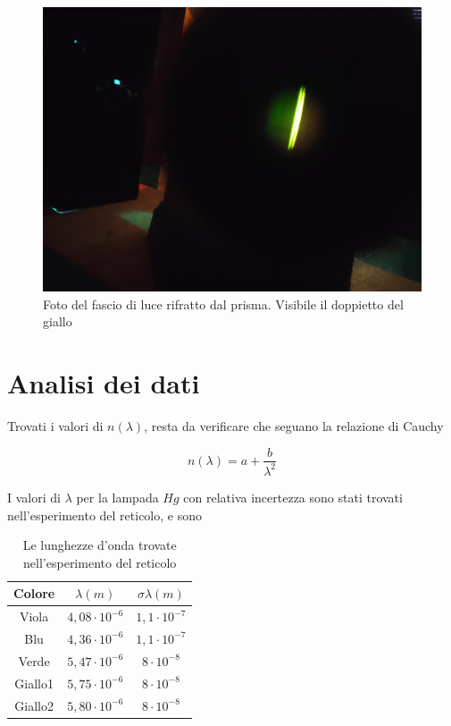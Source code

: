 \documentclass{article}
\begin{document}
\begin{figure}[h!]
  \centering
  \includegraphics[width=0.7\linewidth]{FotoPrisma4}
  \caption{Foto del fascio di luce rifratto dal prisma. Visibile il doppietto del giallo}
  \label{Refraction}
\end{figure}

\clearpage

\section{Analisi dei dati}

Trovati i valori di $n (\lambda)$, resta da verificare che seguano la relazione di Cauchy

\[n(\lambda)=a+\frac{b}{\lambda ^2}\]

I valori di $\lambda$ per la lampada $Hg$ con relativa incertezza sono stati trovati nell'esperimento del reticolo, e sono 

\begin{table}[h!]
\centering
\begin{tabular}{ | c | c | c | }
  \hline
  Colore & $\lambda (m)$ & $\sigma \lambda (m)$ \\
  \hline
  Viola & $4,08 \cdot 10^{-6}$ & $1,1 \cdot 10^{-7}$ \\
  Blu & $4,36 \cdot 10^{-6}$ & $1,1 \cdot 10^{-7}$ \\
  Verde & $5,47 \cdot 10^{-6}$ & $8 \cdot 10^{-8}$ \\
  Giallo1 & $5,75 \cdot 10^{-6}$ & $8 \cdot 10^{-8}$ \\
  Giallo2 & $5,80 \cdot 10^{-6}$ & $8 \cdot 10^{-8}$ \\
  \hline
\end{tabular}
  \caption{Le lunghezze d'onda trovate nell'esperimento del reticolo}
  \label{table:1}
\end{table}
\end{document}
